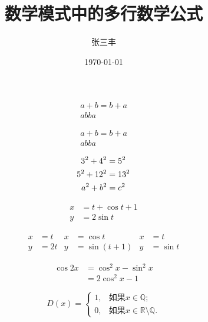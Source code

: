 \documentclass{article}
\title{数学模式中的多行数学公式}
\author{张三丰}
\date{\today}
\begin{document}
	\maketitle
	\begin{gather}
		a + b = b + a \\
		ab ba
	\end{gather}
	
	\begin{gather*}
	a + b = b + a \\
	ab ba
	\end{gather*}
	
	\begin{gather}
	3^2 + 4^2 = 5^2 \notag \\
	5^2 + 12^2 = 13^2 \notag \\
	a^2 + b^2 =c^2\notag
	\end{gather}
	
	\begin{align}
	x &= t+ \cos t + 1 \\
	y &= 2\sin t
	\end{align}
	
	\begin{align*}
	x &= t & x &= \cos t & x & =t \\
	y &= 2t & y & = \sin (t+1) & y &= \sin t
	\end{align*}
	
	\begin{equation}
		\begin{split}
		\cos 2x &= \cos^2 x - \sin^2 x \\
		&= 2\cos^2 x - 1
		\end{split}
	\end{equation}
	
	\begin{equation}
		D(x) = \begin{cases}
		1,& \text{如果} x \in \mathbb{Q}; \\
		0,& \text{如果} x \in \mathbb{R}\setminus\mathbb{Q}.
		\end{cases}
	\end{equation}
\end{document}
